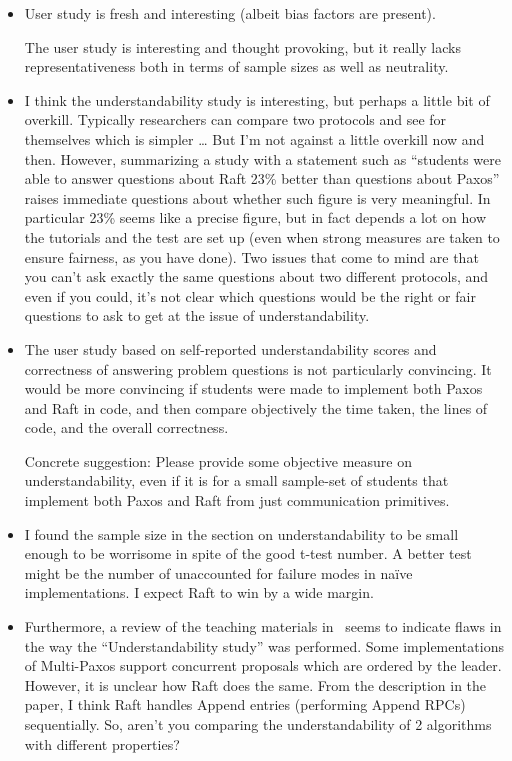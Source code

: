 \begin{itemize}
\item User study is fresh and interesting (albeit bias factors are present).

The user study is interesting and thought provoking, but it really lacks
representativeness both in terms of sample sizes as well as neutrality.

\item I think the understandability study is interesting, but perhaps a
little bit of overkill.  Typically researchers can compare two protocols
and see for themselves which is simpler \ldots
But I'm not against a little overkill now and then.  However,
summarizing a study with a statement such as ``students were able to
answer questions about Raft 23\% better than questions about Paxos''
raises immediate questions about whether such figure is very meaningful.
In particular 23\% seems like a precise figure, but in fact depends a lot
on how the tutorials and the test are set up (even when strong measures
are taken to ensure fairness, as you have done).  Two issues that come
to mind are that you can't ask exactly the same questions about two
different protocols, and even if you could, it's not clear which
questions would be the right or fair questions to ask to get at the
issue of understandability.

\item The user study based on self-reported understandability scores and
correctness of answering problem questions is not particularly
convincing. It would be more convincing if students were made to
implement both Paxos and Raft in code, and then compare objectively the
time taken, the lines of code, and the overall correctness.

Concrete suggestion: Please provide some objective measure on
understandability, even if it is for a small sample-set of students that
implement both Paxos and Raft from just communication primitives.



\item I found the sample size in the section on understandability to be
small enough to be worrisome in spite of the good t-test number.  A
better test might be the number of unaccounted for failure modes in
na\"ive implementations.  I expect Raft to win by a wide margin.

\item 
Furthermore, a review of the teaching materials in~\cite{study} seems to
indicate flaws in the way the ``Understandability study'' was
performed. Some implementations of Multi-Paxos support concurrent
proposals which are ordered by the leader. However, it is unclear how
Raft does the same. From the description in the paper, I think Raft
handles Append entries (performing Append RPCs) sequentially. So,
aren't you comparing the understandability of 2 algorithms with
different properties?


\end{itemize}
